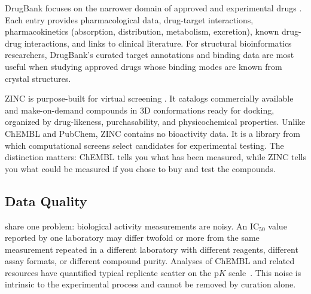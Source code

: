 DrugBank focuses on the narrower domain of approved and experimental drugs \cite{wishart2018}. Each entry provides pharmacological data, drug-target interactions, pharmacokinetics (absorption, distribution, metabolism, excretion), known drug-drug interactions, and links to clinical literature. For structural bioinformatics researchers, DrugBank's curated target annotations and binding data are most useful when studying approved drugs whose binding modes are known from crystal structures.

ZINC is purpose-built for virtual screening \cite{irwin2012}. It catalogs commercially available and make-on-demand compounds in 3D conformations ready for docking, organized by drug-likeness, purchasability, and physicochemical properties. Unlike ChEMBL and PubChem, ZINC contains no bioactivity data. It is a library from which computational screens select candidates for experimental testing. The distinction matters: ChEMBL tells you what has been measured, while ZINC tells you what could be measured if you chose to buy and test the compounds.


\subsection{Data Quality}
\label{sec:data-quality}

 share one problem: biological activity measurements are noisy. An IC$_{50}$ value reported by one laboratory may differ twofold or more from the same measurement repeated in a different laboratory with different reagents, different assay formats, or different compound purity. Analyses of ChEMBL and related resources have quantified typical replicate scatter on the $\mathrm{p}K$ scale~\cite{tiikkainen2013}. This noise is intrinsic to the experimental process and cannot be removed by curation alone.

